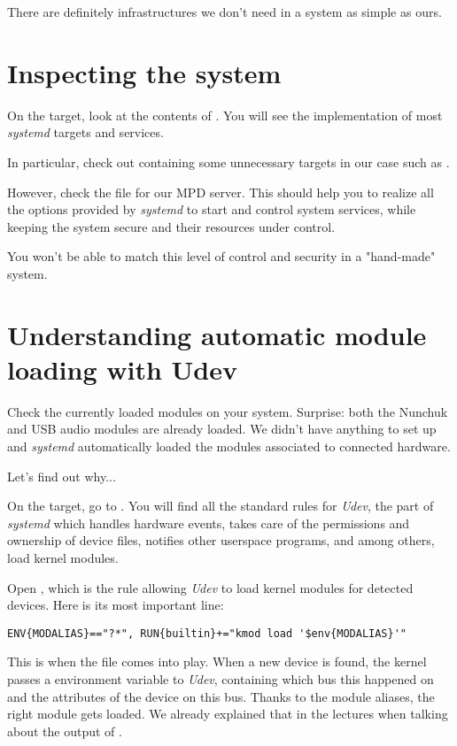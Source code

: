 There are definitely infrastructures we don't need in a system as
simple as ours.

\section{Inspecting the system}

On the target, look at the contents of . You will
see the implementation of most {\em systemd} targets and services.

In particular, check out  containing
some unnecessary targets in our case such as .

However, check the  file for our MPD server.
This should help you to realize all the options provided
by {\em systemd} to start and control system services, while
keeping the system secure and their resources under control.

You won't be able to match this level of control and security in a
"hand-made" system.

\section{Understanding automatic module loading with Udev}

Check the currently loaded modules on your system. Surprise: both
the Nunchuk and USB audio modules are already loaded.
We didn't have anything to set up and {\em systemd} automatically loaded
the modules associated to connected hardware.

Let's find out why...

On the target, go to . You will find all the
standard rules for {\em Udev}, the part of {\em systemd} which handles
hardware events, takes care of the permissions and ownership of device
files, notifies other userspace programs, and among others, load
kernel modules.

Open , which is the rule allowing {\em Udev}
to load kernel modules for detected devices. Here is its most important
line:

\begin{verbatim}
ENV{MODALIAS}=="?*", RUN{builtin}+="kmod load '$env{MODALIAS}'"
\end{verbatim}

This is when the  file comes into play.
When a new device is found, the kernel passes a 
environment variable to {\em Udev}, containing which bus this
happened on and the attributes of the device on this bus.
Thanks to the module aliases, the right module gets loaded.
We already explained that in the lectures when talking about
the output of .

